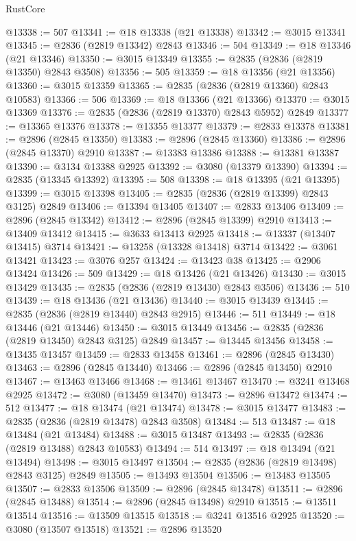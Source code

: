 \begin{lexlean}{RustCore}
\begin{coremodule}
@13338 := 507
@13341 := @18 @13338 (@21 @13338)
@13342 := @3015 @13341
@13345 := @2836 (@2819 @13342) @2843
@13346 := 504
@13349 := @18 @13346 (@21 @13346)
@13350 := @3015 @13349
@13355 := @2835 (@2836 (@2819 @13350) @2843 @3508)
@13356 := 505
@13359 := @18 @13356 (@21 @13356)
@13360 := @3015 @13359
@13365 := @2835 (@2836 (@2819 @13360) @2843 @10583)
@13366 := 506
@13369 := @18 @13366 (@21 @13366)
@13370 := @3015 @13369
@13376 := @2835 (@2836 (@2819 @13370) @2843 @5952) @2849
@13377 := @13365 @13376
@13378 := @13355 @13377
@13379 := @2833 @13378
@13381 := @2896 (@2845 @13350)
@13383 := @2896 (@2845 @13360)
@13386 := @2896 (@2845 @13370) @2910
@13387 := @13383 @13386
@13388 := @13381 @13387
@13390 := @3134 @13388 @2925
@13392 := @3080 (@13379 @13390)
@13394 := @2835 (@13345 @13392)
@13395 := 508
@13398 := @18 @13395 (@21 @13395)
@13399 := @3015 @13398
@13405 := @2835 (@2836 (@2819 @13399) @2843 @3125) @2849
@13406 := @13394 @13405
@13407 := @2833 @13406
@13409 := @2896 (@2845 @13342)
@13412 := @2896 (@2845 @13399) @2910
@13413 := @13409 @13412
@13415 := @3633 @13413 @2925
@13418 := @13337 (@13407 @13415) @3714
@13421 := @13258 (@13328 @13418) @3714
@13422 := @3061 @13421
@13423 := @3076 @257
@13424 := @13423 @38
@13425 := @2906 @13424
@13426 := 509
@13429 := @18 @13426 (@21 @13426)
@13430 := @3015 @13429
@13435 := @2835 (@2836 (@2819 @13430) @2843 @3506)
@13436 := 510
@13439 := @18 @13436 (@21 @13436)
@13440 := @3015 @13439
@13445 := @2835 (@2836 (@2819 @13440) @2843 @2915)
@13446 := 511
@13449 := @18 @13446 (@21 @13446)
@13450 := @3015 @13449
@13456 := @2835 (@2836 (@2819 @13450) @2843 @3125) @2849
@13457 := @13445 @13456
@13458 := @13435 @13457
@13459 := @2833 @13458
@13461 := @2896 (@2845 @13430)
@13463 := @2896 (@2845 @13440)
@13466 := @2896 (@2845 @13450) @2910
@13467 := @13463 @13466
@13468 := @13461 @13467
@13470 := @3241 @13468 @2925
@13472 := @3080 (@13459 @13470)
@13473 := @2896 @13472
@13474 := 512
@13477 := @18 @13474 (@21 @13474)
@13478 := @3015 @13477
@13483 := @2835 (@2836 (@2819 @13478) @2843 @3508)
@13484 := 513
@13487 := @18 @13484 (@21 @13484)
@13488 := @3015 @13487
@13493 := @2835 (@2836 (@2819 @13488) @2843 @10583)
@13494 := 514
@13497 := @18 @13494 (@21 @13494)
@13498 := @3015 @13497
@13504 := @2835 (@2836 (@2819 @13498) @2843 @3125) @2849
@13505 := @13493 @13504
@13506 := @13483 @13505
@13507 := @2833 @13506
@13509 := @2896 (@2845 @13478)
@13511 := @2896 (@2845 @13488)
@13514 := @2896 (@2845 @13498) @2910
@13515 := @13511 @13514
@13516 := @13509 @13515
@13518 := @3241 @13516 @2925
@13520 := @3080 (@13507 @13518)
@13521 := @2896 @13520

\end{coremodule}
\end{lexlean}
